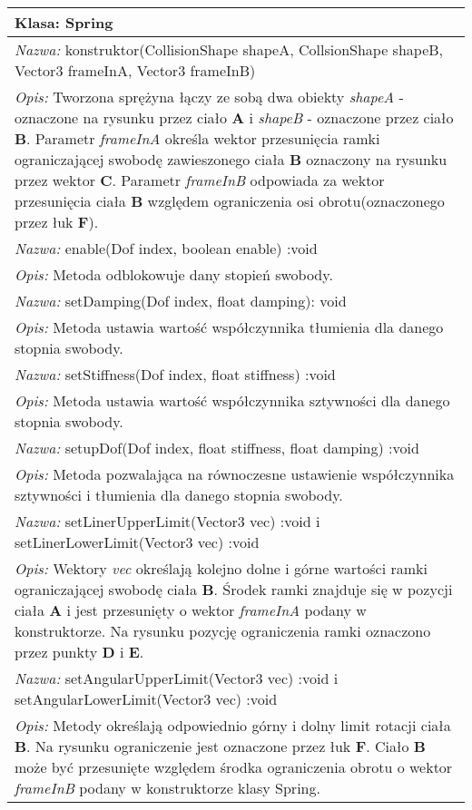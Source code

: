 \begin{tabular}{|p{\textwidth}|}
\hline
\textbf{Klasa: Spring}\\
\hline
\emph{Nazwa: } konstruktor(CollisionShape shapeA, CollsionShape shapeB, Vector3
frameInA, Vector3 frameInB)\\
\emph{Opis: } Tworzona sprężyna łączy ze sobą dwa obiekty \emph{shapeA} -
oznaczone na rysunku przez ciało \textbf{A} i \emph{shapeB} - oznaczone przez
ciało \textbf{B}. Parametr \emph{frameInA} określa wektor przesunięcia ramki
ograniczającej swobodę zawieszonego ciała \textbf{B} oznaczony na rysunku przez
wektor \textbf{C}. Parametr \emph{frameInB} odpowiada za wektor przesunięcia
ciała \textbf{B} względem ograniczenia osi obrotu(oznaczonego przez łuk
\textbf{F}).\\
\hline
\emph{Nazwa: } enable(Dof index, boolean enable) :void\\
\emph{Opis: } Metoda odblokowuje dany stopień swobody.\\
\hline
\emph{Nazwa: } setDamping(Dof index, float damping): void\\
\emph{Opis: } Metoda ustawia wartość współczynnika tłumienia dla danego
stopnia swobody.\\
\hline
\emph{Nazwa: } setStiffness(Dof index, float stiffness) :void\\
\emph{Opis: } Metoda ustawia wartość współczynnika sztywności dla danego
stopnia swobody.\\
\hline
\emph{Nazwa: } setupDof(Dof index, float stiffness, float damping) :void\\
\emph{Opis: } Metoda pozwalająca na równoczesne ustawienie współczynnika
sztywności i tłumienia dla danego stopnia swobody.\\
\hline
\emph{Nazwa: } setLinerUpperLimit(Vector3 vec) :void i
setLinerLowerLimit(Vector3 vec) :void\\
\emph{Opis: } Wektory \emph{vec} określają kolejno dolne i górne wartości ramki
ograniczającej swobodę ciała \textbf{B}. Środek ramki znajduje się w pozycji
ciała \textbf{A} i jest przesunięty o wektor \emph{frameInA} podany w
konstruktorze. Na rysunku pozycję ograniczenia ramki oznaczono przez punkty
\textbf{D} i \textbf{E}.\\
\hline
\emph{Nazwa: } setAngularUpperLimit(Vector3 vec) :void i
setAngularLowerLimit(Vector3 vec) :void\\
\emph{Opis: } Metody określają odpowiednio górny i dolny limit rotacji ciała
\textbf{B}. Na rysunku ograniczenie jest oznaczone przez łuk \textbf{F}. Ciało
\textbf{B} może być przesunięte względem środka ograniczenia obrotu o wektor
\emph{frameInB} podany w konstruktorze klasy Spring.\\
\hline
\end{tabular}